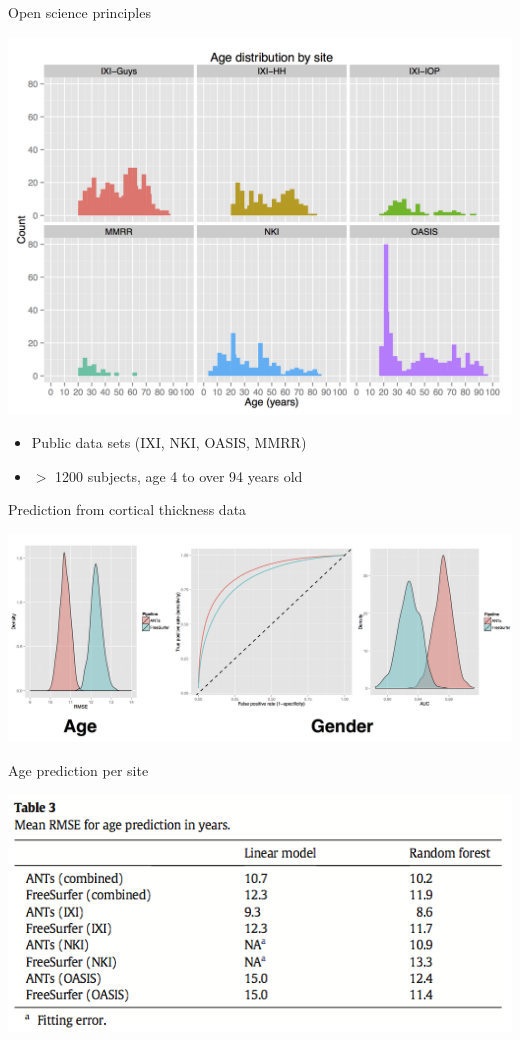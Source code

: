 \documentclass[ignorenonframetext,]{beamer}
\providecommand{\tightlist}{%
  \setlength{\itemsep}{0pt}\setlength{\parskip}{0pt}}
\begin{document}
\begin{frame}{Open science principles}

\includegraphics{./evaluation/figures/ageDistribution.png}

\begin{itemize}
\tightlist
\item
  Public data sets (IXI, NKI, OASIS, MMRR)
\item
  \(>\) 1200 subjects, age 4 to over 94 years old
\end{itemize}

\end{frame}

\begin{frame}{Prediction from cortical thickness data}

\includegraphics{./evaluation/figures/evaluation.png}

\end{frame}

\begin{frame}{Age prediction per site}

\includegraphics{./evaluation/figures/agePredictionPerSite.png}

\end{frame}
\end{document}
